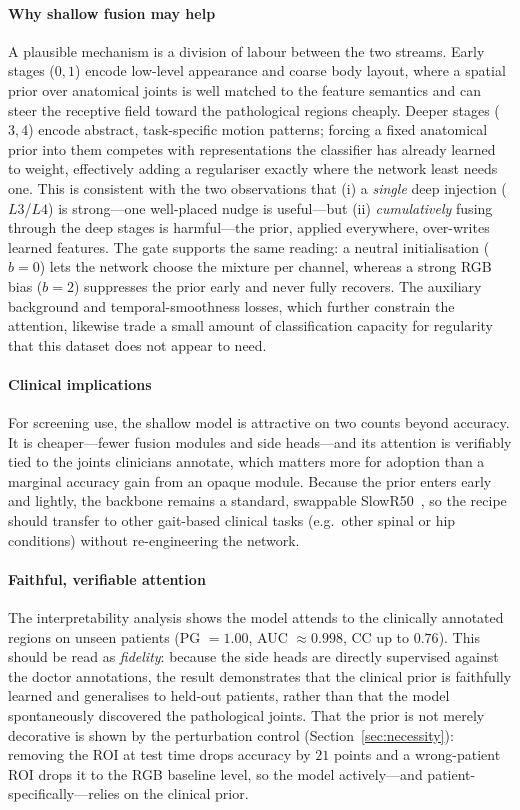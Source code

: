 \documentclass[review,authoryear,times]{elsarticle}
\begin{document}
\paragraph{Why shallow fusion may help}
A plausible mechanism is a division of labour between the two streams. Early
stages ($0,1$) encode low-level appearance and coarse body layout, where a
spatial prior over anatomical joints is well matched to the feature semantics and
can steer the receptive field toward the pathological regions cheaply. Deeper
stages ($3,4$) encode abstract, task-specific motion patterns; forcing a
fixed anatomical prior into them competes with representations the classifier has
already learned to weight, effectively adding a regulariser exactly where the
network least needs one. This is consistent with the two observations that (i) a
\emph{single} deep injection ($L3$/$L4$) is strong---one well-placed nudge is
useful---but (ii) \emph{cumulatively} fusing through the deep stages is
harmful---the prior, applied everywhere, over-writes learned features. The gate
supports the same reading: a neutral initialisation ($b{=}0$) lets the network
choose the mixture per channel, whereas a strong RGB bias ($b{=}2$) suppresses the
prior early and never fully recovers. The auxiliary background and
temporal-smoothness losses, which further constrain the attention, likewise trade
a small amount of classification capacity for regularity that this dataset does
not appear to need.

\paragraph{Clinical implications}
For screening use, the shallow model is attractive on two counts beyond accuracy.
It is cheaper---fewer fusion modules and side heads---and its attention is
verifiably tied to the joints clinicians annotate, which matters more for
adoption than a marginal accuracy gain from an opaque module. Because the prior
enters early and lightly, the backbone remains a standard, swappable
{SlowR50}~\citep{feichtenhofer2019slowfast}, so the recipe should transfer to other
gait-based clinical tasks (e.g.\ other spinal or hip conditions) without
re-engineering the network.

\paragraph{Faithful, verifiable attention}
The interpretability analysis shows the model attends to the clinically annotated
regions on unseen patients (PG $=1.00$, AUC $\approx 0.998$, CC up to $0.76$).
This should be read as \emph{fidelity}: because the side heads are directly
supervised against the doctor annotations, the result demonstrates that the
clinical prior is faithfully learned and generalises to held-out patients, rather
than that the model spontaneously discovered the pathological joints. That the
prior is not merely decorative is shown by the perturbation control
(Section~\ref{sec:necessity}): removing the ROI at test time drops accuracy by
$21$ points and a wrong-patient ROI drops it to the RGB baseline level, so the
model actively---and patient-specifically---relies on the clinical prior.
\end{document}
